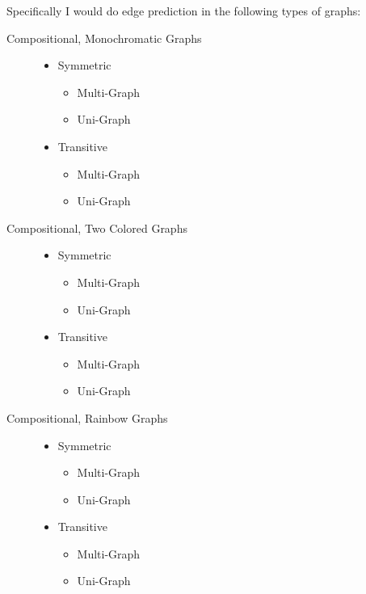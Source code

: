 \documentclass[12pt]{exam} %
\begin{document}
\begin{questions}
{    Specifically I would do edge prediction in the following types of graphs:
    \begin{description}
    \item[Compositional, Monochromatic Graphs]
      \begin{itemize}
      \item Symmetric
        \begin{itemize}
        \item Multi-Graph
        \item Uni-Graph
        \end{itemize}
      \item Transitive
        \begin{itemize}
        \item Multi-Graph
        \item Uni-Graph
        \end{itemize}
      \end{itemize}
    \item[Compositional, Two Colored Graphs]
      \begin{itemize}
      \item Symmetric
        \begin{itemize}
        \item Multi-Graph
        \item Uni-Graph
        \end{itemize}
      \item Transitive
        \begin{itemize}
        \item Multi-Graph
        \item Uni-Graph
        \end{itemize}
      \end{itemize}
    \item[Compositional, Rainbow Graphs]
      \begin{itemize}
      \item Symmetric
        \begin{itemize}
        \item Multi-Graph
        \item Uni-Graph
        \end{itemize}
      \item Transitive
        \begin{itemize}
        \item Multi-Graph
        \item Uni-Graph
        \end{itemize}
      \end{itemize}
    \end{description}

}
\end{questions}
\end{document}
